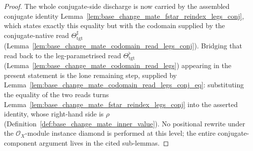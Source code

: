 \begin{proof}
  The whole conjugate-side discharge is now carried by the assembled conjugate identity
  Lemma~\ref{lem:base_change_mate_fstar_reindex_legs_conj}, which states exactly this equality but with
  the codomain supplied by the conjugate-native read \(\Theta_{\mathrm{tgt}}^{\sharp}\)
  (Lemma~\ref{lem:base_change_mate_codomain_read_legs_conj}). Bridging that read back to the
  leg-parametrised read \(\Theta_{\mathrm{tgt}}^{\flat}\)
  (Lemma~\ref{lem:base_change_mate_codomain_read_legs}) appearing in the present statement is the lone
  remaining step, supplied by Lemma~\ref{lem:base_change_mate_codomain_read_legs_conj_eq}: substituting
  the equality of the two reads turns Lemma~\ref{lem:base_change_mate_fstar_reindex_legs_conj} into the
  asserted identity, whose right-hand side is \(\rho\)
  (Definition~\ref{def:base_change_mate_inner_value}). No positional rewrite under the
  \(\mathcal{O}_X\)-module instance diamond is performed at this level; the entire conjugate-component
  argument lives in the cited sub-lemmas.
\end{proof}


